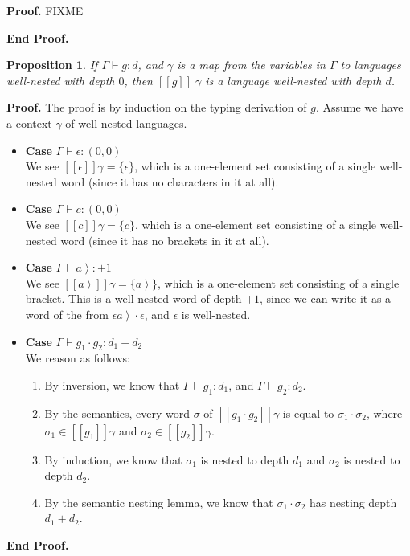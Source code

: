 \documentclass{article}
\newcommand{\rgt}[1]{\left.{#1}\right>}
\newcommand{\judgebalance}[3][\Gamma]{{#1} \vdash {#2} : {#3}}
\newcommand{\zero}{(0,0)}
\newcommand{\interp}[1]{[\![{#1}]\!]}
\newcommand{\setof}[1]{\{{#1}\}}
\newtheorem{prop}{Proposition}
\newenvironment{proof}{\noindent\textbf{Proof.}}{\noindent\textbf{End Proof.}}
\newenvironment{caseblock}{\begin{itemize}}{\end{itemize}}
\newenvironment{case}[1]{\item \textbf{Case} {#1}\\}{}
\begin{document}
\begin{proof}
FIXME

\end{proof}

\begin{prop}
If $\judgebalance{g}{d}$, and $\gamma$ is a map from the variables in $\Gamma$ to 
languages well-nested with depth $0$, then $\interp{g}\;\gamma$ is a language well-nested 
with depth $d$. 
\end{prop}

\begin{proof}
The proof is by induction on the typing derivation of $g$. Assume we have a context $\gamma$ of well-nested
languages.

\begin{caseblock}
  \begin{case}{$\judgebalance{\epsilon}{\zero}$}
    We see $\interp{\epsilon}{\gamma} = \setof{\epsilon}$, which is a one-element set consisting 
    of a single well-nested word (since it has no characters in it at all). 
  \end{case}

  \begin{case}{$\judgebalance{c}{\zero}$}
    We see $\interp{c}{\gamma} = \setof{c}$, which is a one-element set consisting 
    of a single well-nested word (since it has no brackets in it at all). 
  \end{case}

  \begin{case}{$\judgebalance{\rgt{a}}{+1}$}
    We see $\interp{\rgt{a}}{\gamma} = \setof{\rgt{a}}$, which is a one-element set consisting 
    of a single bracket. This is a well-nested word of depth $+1$, since we can write it as a 
    word of the from $\epsilon\rgt{a}\cdot\epsilon$, and $\epsilon$ is well-nested. 
   \end{case}

  \begin{case}{$\judgebalance{g_1\cdot g_2}{d_1 + d_2}$}
    We reason as follows: 
    \begin{enumerate}
      \item By inversion, we know that $\judgebalance{g_1}{d_1}$, and $\judgebalance{g_2}{d_2}$.
      \item By the semantics, every word $\sigma$ of $\interp{g_1\cdot g_2}\gamma$ is equal to 
        $\sigma_1\cdot\sigma_2$, where $\sigma_1 \in \interp{g_1}\gamma$ and $\sigma_2 \in \interp{g_2}\gamma$. 
      \item By induction, we know that $\sigma_1$ is nested to depth $d_1$ and $\sigma_2$ is nested to depth $d_2$.
      \item By the semantic nesting lemma, we know that $\sigma_1 \cdot \sigma_2$ has nesting depth $d_1 + d_2$. 
    \end{enumerate}
  \end{case}


\end{caseblock}
\end{proof}
\end{document}
